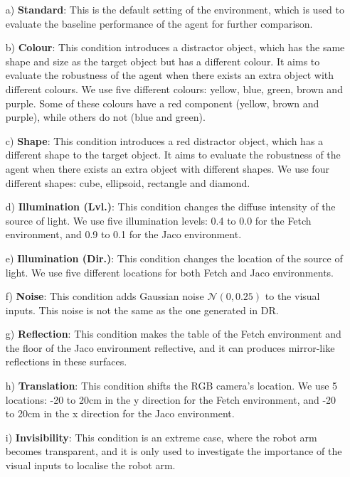 \begin{enumerate}
\item[a)] \textbf{Standard}: This is the default setting of the environment, which is used to evaluate the baseline performance of the agent for further comparison. 

\item[b)] \textbf{Colour}: This condition introduces a distractor object, which has the same shape and size as the target object but has a different colour. It aims to evaluate the robustness of the agent when there exists an extra object with different colours. We use five different colours: yellow, blue, green, brown and purple. Some of these colours have a red component (yellow, brown and purple), while others do not (blue and green).

\item[c)] \textbf{Shape}: This condition introduces a red distractor object, which has a different shape to the target object. It aims to evaluate the robustness of the agent when there exists an extra object with different shapes. We use four different shapes: cube, ellipsoid, rectangle and diamond.

\item[d)] \textbf{Illumination (Lvl.)}: This condition changes the diffuse intensity of the source of light. We use five illumination levels: 0.4 to 0.0 for the Fetch environment, and 0.9 to 0.1 for the Jaco environment.

\item[e)] \textbf{Illumination (Dir.)}: This condition changes the location of the source of light. We use five different locations for both Fetch and Jaco environments.

\item[f)] \textbf{Noise}: This condition adds Gaussian noise $\mathcal{N}(0, 0.25)$ to the visual inputs. This noise is not the same as the one generated in DR.

\item[g)] \textbf{Reflection}: This condition makes the table of the Fetch environment and the floor of the Jaco environment reflective, and it can produces mirror-like reflections in these surfaces.

\item[h)] \textbf{Translation}: This condition shifts the RGB camera's location. We use 5 locations: -20 to 20cm in the y direction for the Fetch environment, and -20 to 20cm in the x direction for the Jaco environment.

\item[i)] \textbf{Invisibility}: This condition is an extreme case, where the robot arm becomes transparent, and it is only used to investigate the importance of the visual inputs to localise the robot arm.
\end{enumerate}

